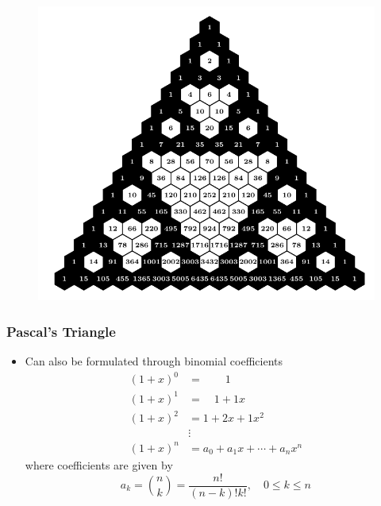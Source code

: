 \documentclass{beamer}
\begin{document}
\begin{frame}
    \begin{figure}
        \centering 
        \includegraphics[scale=0.8]{PascalMod2.pdf}
    \end{figure}
\end{frame}

\begin{frame}
    \frametitle{Pascal's Triangle}
    \begin{itemize}
        \item
        Can also be formulated through binomial coefficients
        \begin{align*}
            (1+x)^{0} &=\qquad 1 \\
            (1+x)^{1} &=\quad 1+1 x \\
            (1+x)^{2} &= 1+2 x+1 x^{2} \\
            & \vdots \\
            (1+x)^{n} &=a_{0}+a_{1} x+\cdots+a_{n} x^{n} 
        \end{align*}
        where coefficients are given by
        \begin{equation*}
            a_{k}= \binom{n}{k} =\frac{n !}{(n-k) ! k !}, \quad 0 \leq k \leq n
        \end{equation*}
    \end{itemize}
\end{frame}
\end{document}
